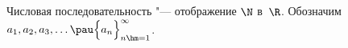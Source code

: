 
    Числовая последовательность "--- отображение $\N$ в~$\R$. Обозначим $a_1,a_2,a_3,\ldots\pau \Big\{a_n\Big\}_{n\hm=1}^\infty$.

